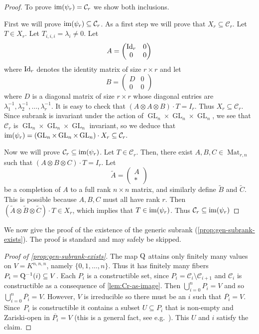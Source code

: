 \documentclass[10pt,a4paper]{article}
\theoremstyle{definition}
\theoremstyle{remark}
\newcommand{\subrank}{{\rm Q}}
\newcommand{\GL}{\operatorname{GL}}
\newcommand{\Mat}{\operatorname{Mat}}
\newcommand{\im}{{\rm im}}
\begin{document}
\begin{proof}
To prove $\im(\psi_r) = \mathcal{C}_r$ we show both inclusions.

First we will prove $\im(\psi_r) \subseteq \mathcal{C}_r$. As a first step we will prove that $X_r \subseteq \mathcal{C}_r$.
Let $T \in X_r$. Let $T_{i,i,i} = \lambda_i \neq 0$. Let 
\[
A = \begin{pmatrix} {\rm Id}_r & 0 \\ 0& 0 \end{pmatrix}
\]
where ${\rm Id}_r$ denotes the identity matrix of size $r \times r$ and let 
\[
B = \begin{pmatrix} D & 0 \\ 0 & 0\end{pmatrix}
\]
where $D$ is a diagonal matrix of size $r \times r$ whose diagonal entries are $\lambda_1^{-1},\lambda_2^{-1},\dots, \lambda_r^{-1}$. It is easy to check that $(A \otimes A \otimes B) \cdot T = I_r$. Thus $X_r \subseteq \mathcal{C}_r$. Since subrank is invariant under the action of $\GL_n \times \GL_n \times \GL_n$, we see that $\mathcal{C}_r$ is $\GL_n \times \GL_n \times \GL_n$ invariant, so we deduce that $\im(\psi_r) = (\GL_n \times \GL_n \times \GL_n) \cdot X_r \subseteq \mathcal{C}_r.$
 
Now we will prove $\mathcal{C}_r \subseteq \im(\psi_r)$. Let $T \in \mathcal{C}_r$. Then, there exist $A,B,C \in \Mat_{r,n}$ such that $(A \otimes B \otimes C) \cdot T = I_r$. Let \[
\widetilde{A} = \begin{pmatrix} A \\ \ast \end{pmatrix}
\]
be a completion of $A$ to a full rank $n \times n$ matrix, and similarly define $\widetilde{B}$ and $\widetilde{C}$. This is possible because $A,B,C$ must all have rank $r$. Then $(\widetilde{A} \otimes \widetilde{B} \otimes \widetilde{C})\cdot T \in X_r$, which implies that $T \in \im(\psi_r)$. Thus $\mathcal{C}_r \subseteq \im(\psi_r)$
\end{proof}

We now give the proof of the existence of the generic subrank (\autoref{prop:gen-subrank-exists}). The proof is standard and may safely be skipped.

\begin{proof}[{Proof of \autoref{prop:gen-subrank-exists}}]
The map $\subrank$ attains only finitely many values on $V = K^{n,n,n}$, namely $\{0,1,\ldots, n\}$. Thus it has finitely many fibers $P_i = \subrank^{-1}(i) \subseteq V$. Each $P_i$ is a constructible set, since $P_i = \mathcal{C}_i \setminus \mathcal{C}_{i+1}$ and $\mathcal{C}_i$ is constructible as a consequence of \autoref{lem:Cr-as-image}. Then $\bigcup_{i=0}^n P_i = V$ and so $\bigcup_{i=0}^n \overline{P_i} = V$. However, $V$ is irreducible so there must be an $i$ such that $\overline{P_i} = V$. Since~$P_i$ is constructible it contains a subset $U \subseteq P_i$ that is non-empty and Zariski-open in $\overline{P_i} = V$ (this is a general fact, see e.g.~\cite{MR1102012}). This $U$ and $i$ satisfy the claim.
\end{proof}
\end{document}
